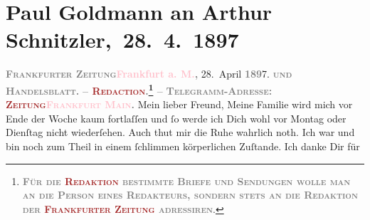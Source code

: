 

               \section[ Paul Goldmann an Arthur Schnitzler, 28. 4. 1897]{Paul Goldmann an Arthur Schnitzler, 28. 4. 1897}\nopagebreak{}\rehead{ }\normalsize\beginnumbering{} \toendnotes[C]{\smallbreak\pagebreak[2]} 
\toendnotes[C]{\smallbreak}\pstart
           \noindent{}{\pb}\textcolor{brown}{\textcolor{gray}{\textbf{\textsc{Frankfurter Zeitung}}}}{}\ledrightnote{\textcolor{brown}{Frankfurter Zeitung}}\hfill \textcolor{gray}{\textbf{\textcolor{pink}{Frankfurt a. M.}{}\ledrightnote{\textcolor{pink}{Frankfurt am Main}},}}{ }28. April \textcolor{gray}{\textbf{189}}7.\pend
           \pstart
           \textsc{\textcolor{gray}{\textbf{und}}}\pend
           \pstart
           \textcolor{gray}{\textbf{\textsc{Handelsblatt.}}}\pend
           \pstart
           \textcolor{gray}{\textbf{\textsc{– \textcolor{brown}{Redaction}{}.\footnote{\noindent{}\textcolor{gray}{\textbf{\textsc{Für die \textcolor{brown}{Redaktion} bestimmte Briefe und Sendungen
                                    wolle man  an die Person eines
                                    Redakteurs, sondern stets \textbf{an die Redaktion der
                                          \textcolor{brown}{Frankfurter Zeitung}} adressiren}}}.} –}}}\pend
           \pstart
           \textcolor{gray}{\textbf{\textsc{Telegramm-Adresse:}}}\pend
           \pstart
           \textcolor{gray}{\textbf{\textsc{\textcolor{brown}{Zeitung}{}\textcolor{pink}{Frankfurt Main}{}\ledrightnote{\textcolor{pink}{Frankfurt am Main}}.}}}\pend
           \pstart\center{}Mein lieber Freund,\pend\pstart
           Meine Familie wird mich vor Ende der Woche kaum fortlaſſen und ſo werde ich Dich wohl
               vor Montag oder Dienſtag nicht wiederſehen. Auch thut mir die Ruhe wahrlich noth. Ich war
               und bin noch zum Theil in einem ſchlimmen körperlichen Zuſtande. Ich danke Dir für
